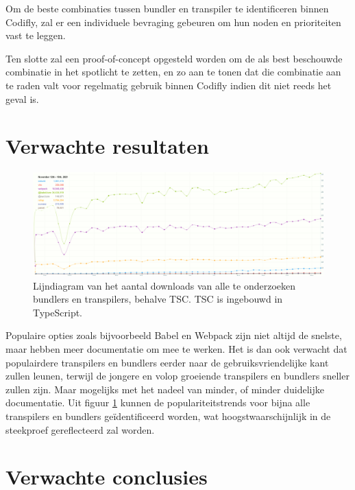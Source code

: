 Om de beste combinaties tussen bundler en transpiler te identificeren binnen Codifly, zal er een individuele bevraging gebeuren om hun noden en prioriteiten vast te leggen.

Ten slotte zal een proof-of-concept opgesteld worden om de als best beschouwde combinatie in het spotlicht te zetten, en zo aan te tonen dat die combinatie aan te raden valt voor regelmatig gebruik binnen Codifly indien dit niet reeds het geval is.

\section{Verwachte resultaten}
\label{sec:verwachte_resultaten}

\begin{figure}[!htp]
  \includegraphics[width=\linewidth]{npmgraph.png}
  \caption{Lijndiagram van het aantal downloads van alle te onderzoeken bundlers en transpilers, behalve TSC. TSC is ingebouwd in TypeScript.}
  \label{fig:NpmDownloadsLineChart}
\end{figure}

Populaire opties zoals bijvoorbeeld Babel en Webpack zijn niet altijd de snelste, maar hebben meer documentatie om mee te werken. Het is dan ook verwacht dat populairdere transpilers en bundlers eerder naar de gebruiksvriendelijke kant zullen leunen, terwijl de jongere en volop groeiende transpilers en bundlers sneller zullen zijn. Maar mogelijks met het nadeel van minder, of minder duidelijke documentatie. Uit figuur \ref{fig:NpmDownloadsLineChart} kunnen de populariteitstrends voor bijna alle transpilers en bundlers geïdentificeerd worden, wat hoogstwaarschijnlijk in de steekproef gereflecteerd zal worden.

\section{Verwachte conclusies}
\label{sec:verwachte_conclusies}

